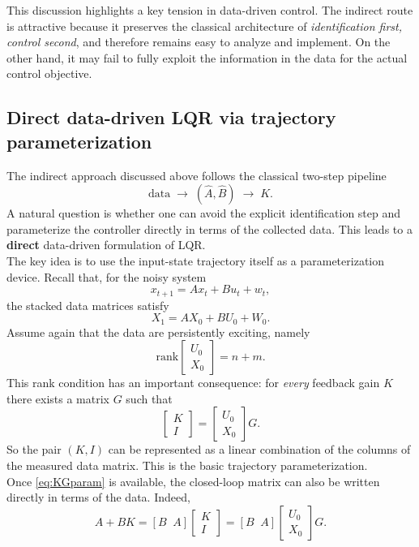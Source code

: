 This discussion highlights a key tension in data-driven control. The indirect route is attractive
because it preserves the classical architecture of \emph{identification first, control second}, and
therefore remains easy to analyze and implement. On the other hand, it may fail to fully exploit
the information in the data for the actual control objective.

\subsection{Direct data-driven LQR via trajectory parameterization}

The indirect approach discussed above follows the classical two-step pipeline
\[
\text{data} \;\longrightarrow\; (\hat A,\hat B) \;\longrightarrow\; K.
\]
A natural question is whether one can avoid the explicit identification step and parameterize the
controller directly in terms of the collected data. This leads to a \textbf{direct} data-driven
formulation of LQR.\\
The key idea is to use the input-state trajectory itself as a parameterization device. Recall that,
for the noisy system
\[
x_{t+1} = A x_t + B u_t + w_t,
\]
the stacked data matrices satisfy
\[
X_1 = A X_0 + B U_0 + W_0.
\]
Assume again that the data are persistently exciting, namely
\[
\text{rank}\!\begin{bmatrix}
U_0\\[0.3em]
X_0
\end{bmatrix}=n+m.
\]
This rank condition has an important consequence: for \emph{every} feedback gain $K$ there
exists a matrix $G$ such that
\begin{equation}
\begin{bmatrix}
K\\[0.3em]
I
\end{bmatrix}
=
\begin{bmatrix}
U_0\\[0.3em]
X_0
\end{bmatrix}G.
\label{eq:KGparam}
\end{equation}
So the pair $(K,I)$ can be represented as a linear combination of the columns of the measured
data matrix. This is the basic trajectory parameterization.\\
Once \eqref{eq:KGparam} is available, the closed-loop matrix can also be written directly in terms
of the data. Indeed,
\[
A+BK
=
[B\;\;A]
\begin{bmatrix}
K\\[0.3em]
I
\end{bmatrix}
=
[B\;\;A]
\begin{bmatrix}
U_0\\[0.3em]
X_0
\end{bmatrix}G.
\]
